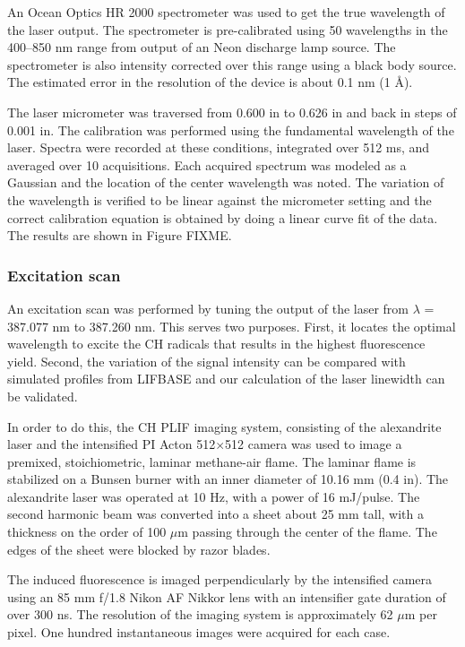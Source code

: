 An Ocean Optics HR 2000 spectrometer was used to get the true wavelength of the laser output.
The spectrometer is pre-calibrated using 50 wavelengths in the 400--850 nm range from output of an Neon discharge lamp source.
The spectrometer is also intensity corrected over this range using a black body source.
The estimated error in the resolution of the device is about 0.1 nm (1 \AA).

The laser micrometer was traversed from 0.600 in to 0.626 in and back in steps of 0.001 in.
The calibration was performed using the fundamental wavelength of the laser.
Spectra were recorded at these conditions, integrated over 512 ms, and averaged over 10 acquisitions.
Each acquired spectrum was modeled as a Gaussian and the location of the center wavelength was noted.
The variation of the wavelength is verified to be linear against the micrometer setting and the correct calibration equation is obtained by doing a linear curve fit of the data.
The results are shown in Figure FIXME.

\subsubsection{Excitation scan}

An excitation scan was performed by tuning the output of the laser from \(\lambda\) = 387.077 nm to 387.260 nm.
This serves two purposes.
First, it locates the optimal wavelength to excite the CH radicals that results in the highest fluorescence yield.
Second, the variation of the signal intensity can be compared with simulated profiles from LIFBASE and our calculation of the laser linewidth can be validated.

In order to do this, the CH PLIF imaging system, consisting of the alexandrite laser and the intensified PI Acton 512\(\times\)512 camera was used to image a premixed, stoichiometric, laminar methane-air flame.
The laminar flame is stabilized on a Bunsen burner with an inner diameter of 10.16 mm (0.4 in).
The alexandrite laser was operated at 10 Hz, with a power of 16 mJ/pulse.
The second harmonic beam was converted into a sheet about 25 mm tall, with a thickness on the order of 100 \(\mu\)m passing through the center of the flame.
The edges of the sheet were blocked by razor blades.

The induced fluorescence is imaged perpendicularly by the intensified camera using an 85 mm f/1.8 Nikon AF Nikkor lens with an intensifier gate duration of over 300 ns.
The resolution of the imaging system is approximately 62 \(\mu\)m per pixel.
One hundred instantaneous images were acquired for each case.

